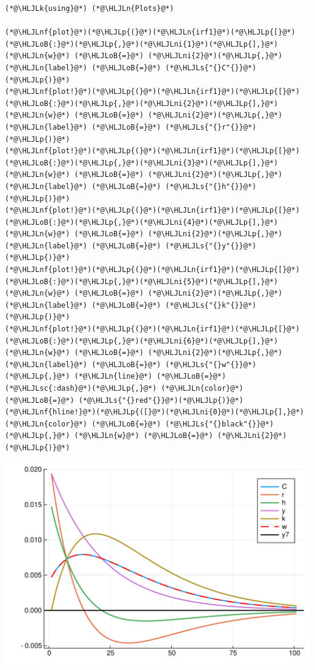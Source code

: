 \documentclass[12pt,a4paper]{article}
\newcommand{\HLJLk}[1]{\textcolor[RGB]{148,91,176}{\textbf{#1}}}
\newcommand{\HLJLn}[1]{#1}
\newcommand{\HLJLnf}[1]{\textcolor[RGB]{66,102,213}{#1}}
\newcommand{\HLJLs}[1]{\textcolor[RGB]{201,61,57}{#1}}
\newcommand{\HLJLsc}[1]{\textcolor[RGB]{201,61,57}{#1}}
\newcommand{\HLJLni}[1]{\textcolor[RGB]{59,151,46}{#1}}
\newcommand{\HLJLoB}[1]{\textcolor[RGB]{102,102,102}{\textbf{#1}}}
\newcommand{\HLJLp}[1]{#1}
\begin{document}
\begin{lstlisting}
(*@\HLJLk{using}@*) (*@\HLJLn{Plots}@*)

(*@\HLJLnf{plot}@*)(*@\HLJLp{(}@*)(*@\HLJLn{irf1}@*)(*@\HLJLp{[}@*)(*@\HLJLoB{:}@*)(*@\HLJLp{,}@*)(*@\HLJLni{1}@*)(*@\HLJLp{],}@*) (*@\HLJLn{w}@*) (*@\HLJLoB{=}@*) (*@\HLJLni{2}@*)(*@\HLJLp{,}@*) (*@\HLJLn{label}@*) (*@\HLJLoB{=}@*) (*@\HLJLs{"{}C"{}}@*)(*@\HLJLp{)}@*)
(*@\HLJLnf{plot!}@*)(*@\HLJLp{(}@*)(*@\HLJLn{irf1}@*)(*@\HLJLp{[}@*)(*@\HLJLoB{:}@*)(*@\HLJLp{,}@*)(*@\HLJLni{2}@*)(*@\HLJLp{],}@*) (*@\HLJLn{w}@*) (*@\HLJLoB{=}@*) (*@\HLJLni{2}@*)(*@\HLJLp{,}@*) (*@\HLJLn{label}@*) (*@\HLJLoB{=}@*) (*@\HLJLs{"{}r"{}}@*)(*@\HLJLp{)}@*)
(*@\HLJLnf{plot!}@*)(*@\HLJLp{(}@*)(*@\HLJLn{irf1}@*)(*@\HLJLp{[}@*)(*@\HLJLoB{:}@*)(*@\HLJLp{,}@*)(*@\HLJLni{3}@*)(*@\HLJLp{],}@*) (*@\HLJLn{w}@*) (*@\HLJLoB{=}@*) (*@\HLJLni{2}@*)(*@\HLJLp{,}@*) (*@\HLJLn{label}@*) (*@\HLJLoB{=}@*) (*@\HLJLs{"{}h"{}}@*)(*@\HLJLp{)}@*)
(*@\HLJLnf{plot!}@*)(*@\HLJLp{(}@*)(*@\HLJLn{irf1}@*)(*@\HLJLp{[}@*)(*@\HLJLoB{:}@*)(*@\HLJLp{,}@*)(*@\HLJLni{4}@*)(*@\HLJLp{],}@*) (*@\HLJLn{w}@*) (*@\HLJLoB{=}@*) (*@\HLJLni{2}@*)(*@\HLJLp{,}@*) (*@\HLJLn{label}@*) (*@\HLJLoB{=}@*) (*@\HLJLs{"{}y"{}}@*)(*@\HLJLp{)}@*)
(*@\HLJLnf{plot!}@*)(*@\HLJLp{(}@*)(*@\HLJLn{irf1}@*)(*@\HLJLp{[}@*)(*@\HLJLoB{:}@*)(*@\HLJLp{,}@*)(*@\HLJLni{5}@*)(*@\HLJLp{],}@*) (*@\HLJLn{w}@*) (*@\HLJLoB{=}@*) (*@\HLJLni{2}@*)(*@\HLJLp{,}@*) (*@\HLJLn{label}@*) (*@\HLJLoB{=}@*) (*@\HLJLs{"{}k"{}}@*)(*@\HLJLp{)}@*)
(*@\HLJLnf{plot!}@*)(*@\HLJLp{(}@*)(*@\HLJLn{irf1}@*)(*@\HLJLp{[}@*)(*@\HLJLoB{:}@*)(*@\HLJLp{,}@*)(*@\HLJLni{6}@*)(*@\HLJLp{],}@*) (*@\HLJLn{w}@*) (*@\HLJLoB{=}@*) (*@\HLJLni{2}@*)(*@\HLJLp{,}@*) (*@\HLJLn{label}@*) (*@\HLJLoB{=}@*) (*@\HLJLs{"{}w"{}}@*)(*@\HLJLp{,}@*) (*@\HLJLn{line}@*) (*@\HLJLoB{=}@*) (*@\HLJLsc{:dash}@*)(*@\HLJLp{,}@*) (*@\HLJLn{color}@*) (*@\HLJLoB{=}@*) (*@\HLJLs{"{}red"{}}@*)(*@\HLJLp{)}@*)
(*@\HLJLnf{hline!}@*)(*@\HLJLp{([}@*)(*@\HLJLni{0}@*)(*@\HLJLp{],}@*) (*@\HLJLn{color}@*) (*@\HLJLoB{=}@*) (*@\HLJLs{"{}black"{}}@*)(*@\HLJLp{,}@*) (*@\HLJLn{w}@*) (*@\HLJLoB{=}@*) (*@\HLJLni{2}@*)(*@\HLJLp{)}@*)
\end{lstlisting}

\includegraphics[width=\linewidth]{figures/yvan_3_1.pdf}
\end{document}
